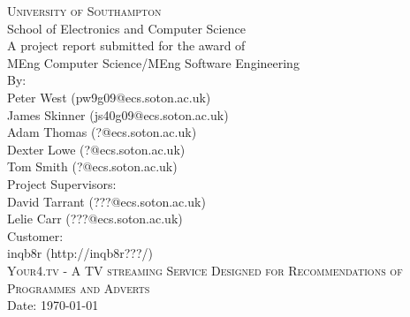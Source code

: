 
\begin{titlepage}

\begin{center}

\textsc{\large{University of Southampton}}\\[0.0cm]

\large{School of Electronics and Computer Science}\\[2.0cm]

\large{A project report submitted for the award of}\\[0.0cm]

\large{MEng Computer Science/MEng Software Engineering}\\[2.0cm]

\large{
	By: \\
	Peter West (pw9g09@ecs.soton.ac.uk) \\
	James Skinner (js40g09@ecs.soton.ac.uk) \\
	Adam Thomas (?@ecs.soton.ac.uk) \\
	Dexter Lowe (?@ecs.soton.ac.uk) \\
	Tom Smith (?@ecs.soton.ac.uk)}\\[2.0cm]

\large{Project Supervisors: \\
		David Tarrant (???@ecs.soton.ac.uk) \\
		Lelie Carr (???@ecs.soton.ac.uk)}\\[1.0cm]

\large{Customer: \\
		inqb8r (http://inqb8r???/)}\\[1.0cm]

\textsc{\large Your4.tv - A TV streaming Service Designed for Recommendations of Programmes and Adverts}\\[3.5cm]

\large{Date: \today}\\[4.0cm]

\end{center}

\end{titlepage}

